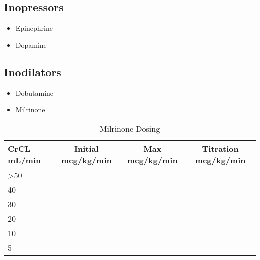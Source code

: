 \documentclass[main.tex]{subfiles}
\begin{document}
\subsection{Inopressors}
\begin{itemize}[noitemsep]
	\item Epinephrine
	\item Dopamine 
\end{itemize}

\subsection{Inodilators}
\begin{itemize}[noitemsep]
	\item Dobutamine
	\item Milrinone
\end{itemize}

\begin{table}[h]
	\centering
	\caption{Milrinone Dosing \autocite{lexi-drugsMilrinone} }
	\label{tab:milrinone-dosing}
	\begin{tabular}{l c c c}
		\textbf{CrCL \si{mL/min}} & \textbf{Initial \si{mcg/kg/min}} & \textbf{Max} \si{mcg/kg/min} & \textbf{Titration} \si{mcg/kg/min} \\ \hline
		\textgreater50 &  & & \\
		40 & & & \\
		30 & & & \\
		20 & & & \\
		10 & & & \\
		5 & & & \\
	\end{tabular}
\end{table}
\end{document}
